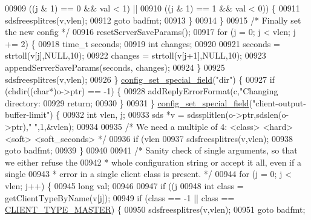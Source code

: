 \begin{DoxyCode}
{{{{{{{00909                 ((j & 1) == 0 && val < 1) ||
00910                 ((j & 1) == 1 && val < 0)) \{
00911                 sdsfreesplitres(v,vlen);
00912                 \textcolor{keywordflow}{goto} badfmt;
00913             \}
00914         \}
00915         \textcolor{comment}{/* Finally set the new config */}
00916         resetServerSaveParams();
00917         \textcolor{keywordflow}{for} (j = 0; j < vlen; j += 2) \{
00918             time\_t seconds;
00919             \textcolor{keywordtype}{int} changes;
00920 
00921             seconds = strtoll(v[j],NULL,10);
00922             changes = strtoll(v[j+1],NULL,10);
00923             appendServerSaveParams(seconds, changes);
00924         \}
00925         sdsfreesplitres(v,vlen);
00926     \} \hyperlink{config_8c_a7bdda941057dd2668e0e5b5df1d3ab4c}{config\_set\_special\_field}(\textcolor{stringliteral}{"dir"}) \{
00927         \textcolor{keywordflow}{if} (chdir((\textcolor{keywordtype}{char}*)o->ptr) == -1) \{
00928             addReplyErrorFormat(c,\textcolor{stringliteral}{"Changing directory: %
00929             \textcolor{keywordflow}{return};
00930         \}
00931     \} \hyperlink{config_8c_a7bdda941057dd2668e0e5b5df1d3ab4c}{config\_set\_special\_field}(\textcolor{stringliteral}{"client-output-buffer-limit"}) \{
00932         \textcolor{keywordtype}{int} vlen, j;
00933         sds *v = sdssplitlen(o->ptr,sdslen(o->ptr),\textcolor{stringliteral}{" "},1,&vlen);
00934 
00935         \textcolor{comment}{/* We need a multiple of 4: <class> <hard> <soft> <soft\_seconds> */}
00936         \textcolor{keywordflow}{if} (vlen %
00937             sdsfreesplitres(v,vlen);
00938             \textcolor{keywordflow}{goto} badfmt;
00939         \}
00940 
00941         \textcolor{comment}{/* Sanity check of single arguments, so that we either refuse the}
00942 \textcolor{comment}{         * whole configuration string or accept it all, even if a single}
00943 \textcolor{comment}{         * error in a single client class is present. */}
00944         \textcolor{keywordflow}{for} (j = 0; j < vlen; j++) \{
00945             \textcolor{keywordtype}{long} val;
00946 
00947             \textcolor{keywordflow}{if} ((j %
00948                 \textcolor{keywordtype}{int} \textcolor{keyword}{class} = getClientTypeByName(v[j]);
00949                 \textcolor{keywordflow}{if} (\textcolor{keyword}{class} == -1 || \textcolor{keyword}{class} == \hyperlink{server_8h_ae96c04932d9a47108994d8f337fd8563}{CLIENT\_TYPE\_MASTER}) \{
00950                     sdsfreesplitres(v,vlen);
00951                     \textcolor{keywordflow}{goto} badfmt;
}}}}}}}}
\end{DoxyCode}
